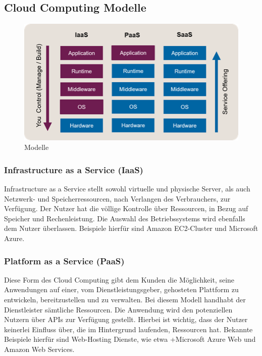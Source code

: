 \subsection{Cloud Computing Modelle}

\begin{figure}[h]
    \centering
    \includegraphics[scale=0.9]{sections/cloud-computing/images/models.png}
    \caption{Modelle}
\end{figure}

\subsubsection{Infrastructure as a Service (IaaS)}

Infrastructure as a Service stellt sowohl virtuelle und physische Server, als auch Netzwerk- und Speicherressourcen, nach Verlangen des Verbrauchers, zur Verfügung. Der Nutzer hat die völlige Kontrolle über Ressourcen, in Bezug auf Speicher und Rechenleistung. Die Auswahl des Betriebssystems wird ebenfalls dem Nutzer überlassen. Beispiele hierfür sind Amazon EC2-Cluster und Microsoft Azure.

\subsubsection{Platform as a Service (PaaS)}

Diese Form des Cloud Computing gibt dem Kunden die Möglichkeit, seine Anwendungen auf einer, vom Dienstleistungsgeber, gehosteten Plattform zu entwickeln, bereitzustellen und zu verwalten. Bei diesem Modell handhabt der Dienstleister sämtliche Ressourcen. Die Anwendung wird den potenziellen Nutzern über APIs zur Verfügung gestellt. Hierbei ist wichtig, dass der Nutzer keinerlei Einfluss über, die im Hintergrund laufenden, Ressourcen hat. Bekannte Beispiele hierfür sind Web-Hosting Dienste, wie etwa +Microsoft Azure Web und Amazon Web Services.

